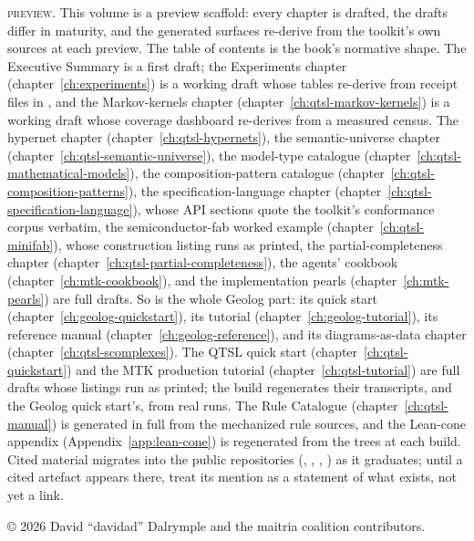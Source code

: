 \documentclass[10pt,a4paper,oneside]{book}
\theoremstyle{definition}
\theoremstyle{plain}
\theoremstyle{remark}
\theoremstyle{definition}
\begin{document}
\vfill
\noindent\colorbox{stubgray}{\parbox{\dimexpr\linewidth-2\fboxsep}{%
\textsc{preview.} This volume is a preview scaffold: every chapter is
drafted, the drafts differ in maturity, and the generated surfaces
re-derive from the toolkit's own sources at each preview. The table of
contents is the book's normative shape. The Executive Summary is a
first draft; the Experiments chapter (chapter~\ref{ch:experiments}) is
a working draft whose tables re-derive from receipt files in
, and the Markov-kernels
chapter (chapter~\ref{ch:qtsl-markov-kernels}) is a working draft
whose coverage dashboard re-derives from a measured census. The
hypernet chapter (chapter~\ref{ch:qtsl-hypernets}), the
semantic-universe chapter (chapter~\ref{ch:qtsl-semantic-universe}),
the model-type catalogue
(chapter~\ref{ch:qtsl-mathematical-models}), the composition-pattern
catalogue (chapter~\ref{ch:qtsl-composition-patterns}), the
specification-language chapter
(chapter~\ref{ch:qtsl-specification-language}), whose API sections
quote the toolkit's conformance corpus verbatim, the
semiconductor-fab worked example (chapter~\ref{ch:qtsl-minifab}),
whose construction listing runs as printed, the partial-completeness
chapter (chapter~\ref{ch:qtsl-partial-completeness}), the agents'
cookbook (chapter~\ref{ch:mtk-cookbook}), and the implementation
pearls (chapter~\ref{ch:mtk-pearls}) are full drafts. So is the whole
Geolog part: its quick start (chapter~\ref{ch:geolog-quickstart}),
its tutorial (chapter~\ref{ch:geolog-tutorial}), its reference manual
(chapter~\ref{ch:geolog-reference}), and its diagrams-as-data chapter
(chapter~\ref{ch:qtsl-scomplexes}). The QTSL quick start
(chapter~\ref{ch:qtsl-quickstart}) and the MTK production tutorial
(chapter~\ref{ch:qtsl-tutorial}) are full drafts whose listings run
as printed; the build regenerates their transcripts, and the Geolog
quick start's, from real runs. The Rule Catalogue
(chapter~\ref{ch:qtsl-manual}) is generated in full from the
mechanized rule sources, and the Lean-cone appendix
(Appendix~\ref{app:lean-cone}) is regenerated from the 
trees at each build. Cited material migrates into the public
repositories (,
, ,
) as it graduates; until a
cited artefact appears there, treat its mention as a statement of
what exists, not yet a link.}}\par
\vspace*{\fill}
\noindent\copyright{} 2026 David ``davidad'' Dalrymple and the maitria coalition
contributors.\par\nopagebreak\smallskip
\end{document}
